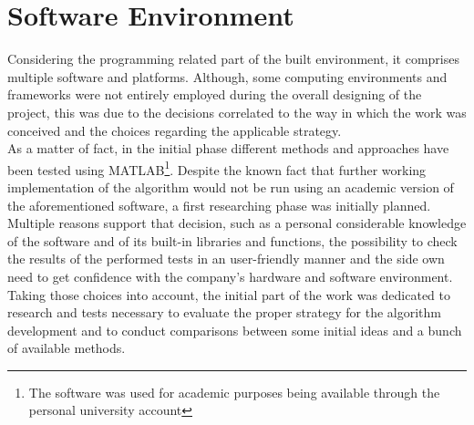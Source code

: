 \section{Software Environment}
\label{section:software-env}

Considering the programming related part of the built environment, it comprises multiple software and platforms. 
Although, some computing environments and frameworks were not entirely employed during the overall designing of the project, this was due to the decisions correlated to the way in which the work was conceived and the choices regarding the applicable strategy. \\
As a matter of fact, in the initial phase different methods and approaches have been tested using MATLAB\footnote{The software was used for academic purposes being available through the personal university account}. 
Despite the known fact that further working implementation of the algorithm would not be run using an academic version of the aforementioned software, a first researching phase was initially planned.
Multiple reasons support that decision, such as a personal considerable knowledge of the software and of its built-in libraries and functions, the possibility to check the results of the performed tests in an user-friendly manner and the side own need to get confidence with the company's hardware and software environment.\\
Taking those choices into account, the initial part of the work was dedicated to research and tests necessary to evaluate the proper strategy for the algorithm development and to conduct comparisons between some initial ideas and a bunch of available methods.\\


